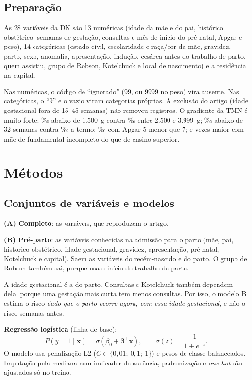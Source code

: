 \documentclass[12pt]{article}
\begin{document}
\subsection{Preparação}

As 28 variáveis da DN são 13 numéricas (idade da mãe e do pai, histórico obstétrico, semanas de gestação, consultas e mês de início do pré-natal, Apgar e peso), 14 categóricas (estado civil, escolaridade e raça/cor da mãe, gravidez, parto, sexo, anomalia, apresentação, indução, cesárea antes do trabalho de parto, quem assistiu, grupo de Robson, Kotelchuck e local de nascimento) e a residência na capital.

Nas numéricas, o código de ``ignorado'' (99, ou 9999 no peso) vira ausente. Nas categóricas, o ``9'' e o vazio viram categorias próprias. A exclusão do artigo (idade gestacional fora de 15--45 semanas) não removeu registros. O gradiente da TMN é muito forte: \tmnPesoMuitoBaixo{}‰ abaixo de 1.500~g contra \tmnPesoNormal{}‰ entre 2.500 e 3.999~g; \tmnIgMuitoPrematuro{}‰ abaixo de 32 semanas contra \tmnIgTermo{}‰ a termo; \tmnApgarBaixo{}‰ com Apgar 5 menor que 7; e \razaoEscol{} vezes maior com mãe de fundamental incompleto do que de ensino superior.

\section{Métodos}

\subsection{Conjuntos de variáveis e modelos}

\textbf{(A) Completo}: as \nVarsA{} variáveis, que reproduzem o artigo.

\textbf{(B) Pré-parto}: as \nVarsB{} variáveis conhecidas na admissão para o parto (mãe, pai, histórico obstétrico, idade gestacional, gravidez, apresentação, pré-natal, Kotelchuck e capital). Saem as variáveis do recém-nascido e do parto. O grupo de Robson também sai, porque usa o início do trabalho de parto.

A idade gestacional é a do parto. Consultas e Kotelchuck também dependem dela, porque uma gestação mais curta tem menos consultas. Por isso, o modelo B estima o risco \emph{dado que o parto ocorre agora, com essa idade gestacional}, e não o risco semanas antes.

\textbf{Regressão logística} (linha de base):
\begin{equation}
P(y{=}1\mid\mathbf{x}) = \sigma(\beta_0 + \boldsymbol\beta^\top\mathbf{x}), \qquad \sigma(z) = \frac{1}{1+e^{-z}}.
\end{equation}
O modelo usa penalização L2 ($C \in \{0{,}01;\ 0{,}1;\ 1\}$) e pesos de classe balanceados. Imputação pela mediana com indicador de ausência, padronização e \textit{one-hot} são ajustados só no treino.
\end{document}
